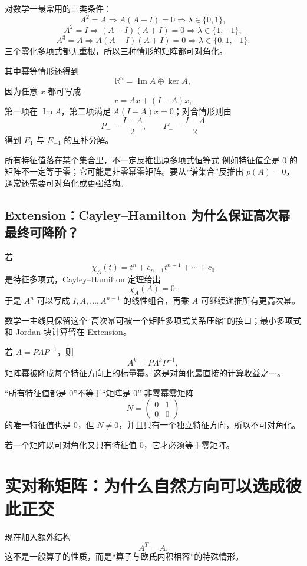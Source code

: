 \documentclass[11pt,a4paper]{ctexart}
\begin{document}
对数学一最常用的三类条件：
\[
A^2=A
\Rightarrow
A(A-I)=0
\Rightarrow
\lambda\in\{0,1\},
\]
\[
A^2=I
\Rightarrow
(A-I)(A+I)=0
\Rightarrow
\lambda\in\{1,-1\},
\]
\[
A^3=A
\Rightarrow
A(A-I)(A+I)=0
\Rightarrow
\lambda\in\{0,1,-1\}.
\]
三个零化多项式都无重根，所以三种情形的矩阵都可对角化。

其中幂等情形还得到
\[
\boxed{\mathbb R^n=\operatorname{Im}A\oplus\ker A,}
\]
因为任意 $x$ 都可写成
\[
x=Ax+(I-A)x,
\]
第一项在 $\operatorname{Im}A$，第二项满足 $A(I-A)x=0$；对合情形则由
\[
P_+=\frac{I+A}{2},
\qquad
P_-=\frac{I-A}{2}
\]
得到 $E_1$ 与 $E_{-1}$ 的互补分解。

\begin{warnbox}{所有特征值落在某个集合里，不一定反推出原多项式恒等式}
例如特征值全是 $0$ 的矩阵不一定等于零；它可能是非零幂零矩阵。要从“谱集合”反推出 $p(A)=0$，通常还需要可对角化或更强结构。
\end{warnbox}

\subsection{Extension：Cayley--Hamilton 为什么保证高次幂最终可降阶？}
若
\[
\chi_A(t)=t^n+c_{n-1}t^{n-1}+\cdots+c_0
\]
是特征多项式，Cayley--Hamilton 定理给出
\[
\chi_A(A)=0.
\]
于是 $A^n$ 可以写成 $I,A,\dots,A^{n-1}$ 的线性组合，再乘 $A$ 可继续递推所有更高次幂。

数学一主线只保留这个“高次幂可被一个矩阵多项式关系压缩”的接口；最小多项式和 Jordan 块计算留在 Extension。

若 $A=P\Lambda P^{-1}$，则
\[
\boxed{A^k=P\Lambda^kP^{-1},}
\]
矩阵幂被降成每个特征方向上的标量幂。这是对角化最直接的计算收益之一。

\begin{warnbox}{“所有特征值都是 0”不等于“矩阵是 0”}
非零幂零矩阵
\[
N=\begin{pmatrix}0&1\\0&0\end{pmatrix}
\]
的唯一特征值也是 $0$，但 $N\neq0$，并且只有一个独立特征方向，所以不可对角化。

若一个矩阵既可对角化又只有特征值 $0$，它才必须等于零矩阵。
\end{warnbox}

\section{实对称矩阵：为什么自然方向可以选成彼此正交}

现在加入额外结构
\[
A^T=A.
\]
这不是一般算子的性质，而是“算子与欧氏内积相容”的特殊情形。
\end{document}
